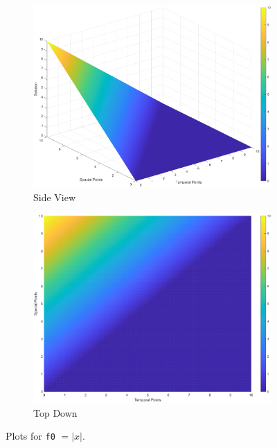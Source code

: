 \documentclass[]{article}
\def\incode#1{\texttt{#1}}
\begin{document}
	\begin{figure}[htbp]
		\centering
		\begin{subfigure}[b]{0.45\textwidth}
			\includegraphics[width=\textwidth]{images/f2_side.eps}
			\caption{Side View}
		\end{subfigure}
		\hfill
		\begin{subfigure}[b]{0.45\textwidth}
			\includegraphics[width=\textwidth]{images/f2_top.eps}
			\caption{Top Down}
		\end{subfigure}
		\caption{Plots for \incode{f0} $= |x|$.}
		\label{fig:both_images}
	\end{figure}
\end{document}
